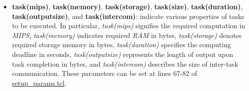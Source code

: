 \begin{itemize}
    \item \textbf{task(mips)}, \textbf{task(memory)}, \textbf{task(storage)}, \textbf{task(size)}, \textbf{task(duration)}, \textbf{task(outputsize)}, and \textbf{task(intercom)}: indicate various properties of tasks to be executed. In particular, \emph{task(mips)} signifies the required computation in \emph{MIPS}, \emph{task(memory)} indicates required \emph{RAM} in bytes, \emph{task(storage)} denotes required storage memory in bytes, \emph{task(duration)} specifies the computing deadline in seconds, \emph{task(outputsize)} represents the length of output upon task completion in bytes, and \emph{task(intercom)} describes the size of inter-task communication. These parameters can be set at lines 67-82 of \href{https://github.com/vincenzo-emanuele/masters-degree-thesis/blob/main/greencloud\_modified\_src/scripts/setup\_params.tcl}{setup\_params.tcl}.



\end{itemize}

